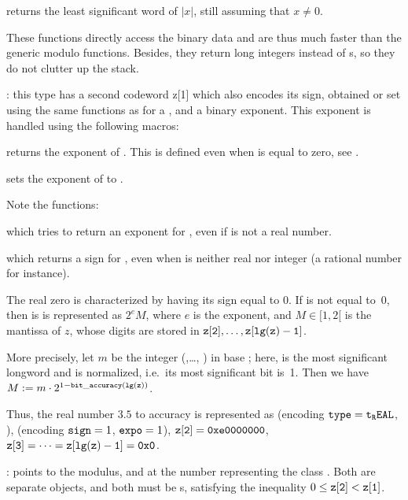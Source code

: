  returns the least significant word of $|x|$, still
assuming that $x\neq 0$.

These functions directly access the binary data and are thus much faster than
the generic modulo functions. Besides, they return long integers instead of
s, so they do not clutter up the stack.

:
this type has a second codeword z[1] which also encodes its sign, obtained
or set using the same functions as for a , and a binary exponent.
This exponent is handled using the following macros:

 returns the exponent of .
This is defined even when  is equal to zero, see
.

 sets the exponent of  to .

\noindent Note the functions:

 which tries to return an exponent for ,
even if  is not a real number.

 which returns a sign for , even when
 is neither real nor integer (a rational number for instance).

The real zero is characterized by having its sign equal to 0. If  is
not equal to~0, then is is represented as $2^e M$, where $e$ is the exponent,
and $M\in [1, 2[$ is the mantissa of $z$, whose digits are stored in
${\tt z[2]},\dots, {\tt z[lg(z)-1]}$.

More precisely, let $m$ be the integer (,\dots, )
in base ; here,  is the most significant
longword and is normalized, i.e.~its most significant bit is~1. Then we have
$M := m \cdot 2^{1 - {\tt bit\_accuracy(lg(z))}}$.

Thus, the real number $3.5$ to accuracy  is
represented as  (encoding ${\tt type} = {\tt t_REAL}$, ),
 (encoding ${\tt sign} = 1$, ${\tt expo} = 1$), ${\tt z[2]} =
{\tt 0xe0000000}$, ${\tt z[3]} =\dots = {\tt z[lg(z)-1]} = {\tt 0x0}$.

:
 points to the modulus, and  at the number representing
the class . Both are separate  objects, and both must be
s, satisfying the inequality $0 \le {\tt z[2]} < {\tt z[1]}$.

